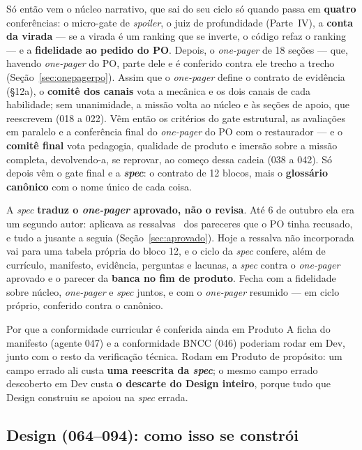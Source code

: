 \documentclass[11pt,a4paper]{article}
\newcommand{\bolinha}[1]{\tikz[baseline=-0.5ex]{\fill[#1] (0,0) circle (0.33em);}}
\newcommand{\statusAmbar}{\bolinha{sinalAmbar}}
\begin{document}
Só então vem o núcleo narrativo, que sai do seu ciclo só quando passa em \textbf{quatro} conferências: o micro-gate de \emph{spoiler}, o juiz de profundidade (Parte~IV), a \textbf{conta da virada} --- se a virada é um ranking que se inverte, o código refaz o ranking --- e a \textbf{fidelidade ao pedido do PO}. Depois, o \emph{one-pager} de 18 seções --- que, havendo \emph{one-pager} do PO, parte dele e é conferido contra ele trecho a trecho (Seção~\ref{sec:onepagerpo}). Assim que o \emph{one-pager} define o contrato de evidência (\S12a), o \textbf{comitê dos canais} vota a mecânica e os dois canais de cada habilidade; sem unanimidade, a missão volta ao núcleo e às seções de apoio, que reescrevem (018 a 022). Vêm então os critérios do gate estrutural, as avaliações em paralelo e a conferência final do \emph{one-pager} do PO com o restaurador --- e o \textbf{comitê final} vota pedagogia, qualidade de produto e imersão sobre a missão completa, devolvendo-a, se reprovar, ao começo dessa cadeia (038 a 042). Só depois vêm o gate final e a \textbf{\emph{spec}}: o contrato de 12 blocos, mais o \textbf{glossário canônico} com o nome único de cada coisa.

A \emph{spec} \textbf{traduz o \emph{one-pager} aprovado, não o revisa}. Até 6 de outubro ela era um segundo autor: aplicava as ressalvas \statusAmbar\ dos pareceres que o PO tinha recusado, e tudo a jusante a seguia (Seção~\ref{sec:aprovado}). Hoje a ressalva não incorporada vai para uma tabela própria do bloco 12, e o ciclo da \emph{spec} confere, além de currículo, manifesto, evidência, perguntas e lacunas, a \emph{spec} contra o \emph{one-pager} aprovado e o parecer da \textbf{banca no fim de produto}. Fecha com a fidelidade sobre núcleo, \emph{one-pager} e \emph{spec} juntos, e com o \emph{one-pager} resumido --- em ciclo próprio, conferido contra o canônico.

\begin{caixaConceito}{Por que a conformidade curricular é conferida ainda em Produto}
A ficha do manifesto (agente 047) e a conformidade BNCC (046) poderiam rodar em Dev, junto com o resto da verificação técnica. Rodam em Produto de propósito: um campo errado ali custa \textbf{uma reescrita da \emph{spec}}; o mesmo campo errado descoberto em Dev custa \textbf{o descarte do Design inteiro}, porque tudo que Design construiu se apoiou na \emph{spec} errada.
\end{caixaConceito}

\subsection{Design (064--094): como isso se constrói}
\end{document}
